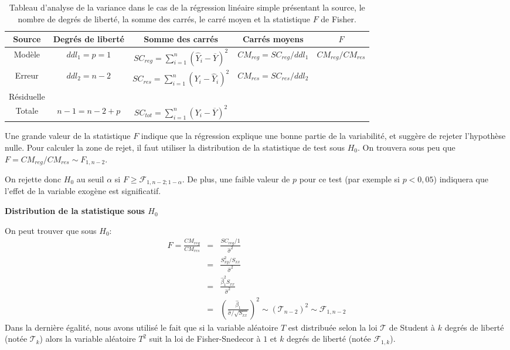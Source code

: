 \begin{table}[htb!]
\caption{Tableau d'analyse de la variance dans le cas de la régression linéaire simple présentant la source, le nombre de degrés de liberté, la somme des carrés, le carré moyen et la statistique $F$ de Fisher.}
\centering
\begin{footnotesize}
\renewcommand{\arraystretch}{1.6}
\begin{tabular}{|c|c|c|c|c|}\hline
Source & Degrés de liberté & Somme des carrés & Carrés moyens & $F$ \\ \hline
Modèle & $ddl_1=p=1$ & $SC_{reg}=\sum_{i=1}^n (\hat Y_i - \overline Y)^2$ & $CM_{reg}=SC_{reg}/ddl_1$  & $CM_{reg}/CM_{res}$ \\ \hline
Erreur & $ddl_2=n-2$ & $SC_{res}=\sum_{i=1}^n (Y_i - \hat Y_i)^2$ & $CM_{res}=SC_{res}/ddl_2$ & \vspace*{-3 mm}\\
Résiduelle & & & & \\ \hline
Totale & $n-1=n-2+p$ & $SC_{tot}=\sum_{i=1}^n (Y_i - \overline Y)^2$ &  & \\ \hline
\end{tabular}
\end{footnotesize}
\label{tab:tabanova}
\end{table}

Une grande valeur de la statistique $F$ indique que la régression explique une bonne partie de la variabilité, et suggère de rejeter l'hypothèse nulle. Pour calculer la zone de rejet, il faut utiliser la distribution de la statistique de test sous $H_0$. On trouvera sous peu que $F = CM_{reg} / CM_{res} \sim F_{1,n-2}$.

On rejette donc $H_0$ au seuil $\alpha$ si $F\geq \mathcal{F}_{1,n-2;1-\alpha}$. De plus, une faible valeur de $p$ pour ce test (par exemple si $p<0,05$) indiquera que l'effet de la variable exogène est significatif.

\textbf{Distribution de la statistique sous $H_0$}

On peut trouver que sous $H_0$:
\begin{eqnarray*}
F =  \frac{CM_{reg}}{CM_{res}}&=& \frac{SC_{reg}/1}{\hat\sigma^2}\\
 &=& \frac{S_{xy}^2/S_{xx}}{\hat\sigma^2}\\
 &=& \frac{\hat{\beta}_1^2 S_{xx}}{\hat\sigma^2}\\
 &=& \left(\frac{\hat{\beta}_1}{\hat\sigma/\sqrt{S_{xx}}}\right)^2 \sim (\mathcal{T}_{n-2})^2 \sim \mathcal{F}_{1,n-2}
\end{eqnarray*}
Dans la dernière égalité, nous avons utilisé le fait que si la variable aléatoire $T$ est distribuée selon la loi $\mathcal{T}$ de Student à $k$ degrés de liberté (notée $\mathcal{T}_k$) alors la variable aléatoire $T^2$ suit la loi de Fisher-Snedecor à $1$ et $k$ degrés de liberté (notée $\mathcal{F}_{1,k}$).

